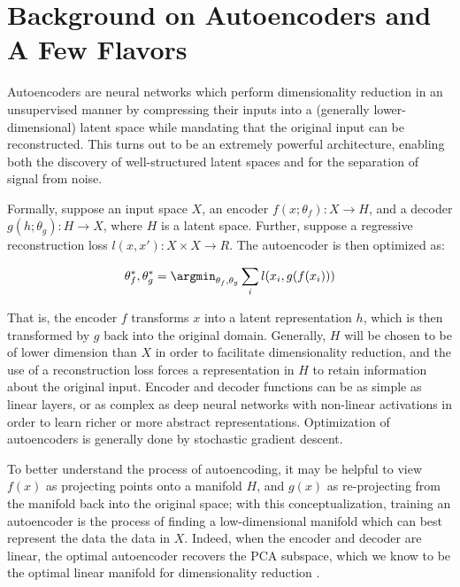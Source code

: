 
\section{Background on Autoencoders and A Few Flavors}

Autoencoders are neural networks which perform dimensionality
reduction in an unsupervised manner by compressing their inputs into
a (generally lower-dimensional) latent space while mandating that the
original input can be reconstructed. This turns out to be an
extremely powerful architecture, enabling both the discovery of
well-structured latent spaces and for the separation of signal from
noise.

Formally, suppose an input space $X$, an encoder $f(x ; \theta_f): X
\to H$, and a decoder $g(h ; \theta_g): H \to X$, where $H$ is a
latent space. Further, suppose a regressive reconstruction loss $l(x,
x'): X \times X \to R$. The autoencoder is then optimized as:

\begin{align*}
    \theta_f^*, \theta_g^* = \argmin_{\theta_f, \theta_g} \sum_i l(x_i, g(f(x_i)))
\end{align*}

That is, the encoder $f$ transforms $x$ into a latent representation
$h$, which is then transformed by $g$ back into the original domain.
Generally, $H$ will be chosen to be of lower dimension than $X$ in
order to facilitate dimensionality reduction, and the use of a
reconstruction loss forces a representation in $H$ to retain
information about the original input. Encoder and decoder functions
can be as simple as linear layers, or as complex as deep neural
networks with non-linear activations in order to learn richer or more
abstract representations. Optimization of autoencoders is generally
done by stochastic gradient descent.

To better understand the process of autoencoding, it may be helpful
to view $f(x)$ as projecting points onto a manifold $H$, and $g(x)$
as re-projecting from the manifold back into the original space; with
this conceptualization, training an autoencoder is the process of
finding a low-dimensional manifold which can best represent the data
the data in $X$. Indeed, when the encoder and decoder are linear, the
optimal autoencoder recovers the PCA subspace, which we know to be
the optimal linear manifold for dimensionality reduction
\cite{alain2014regularized}.


